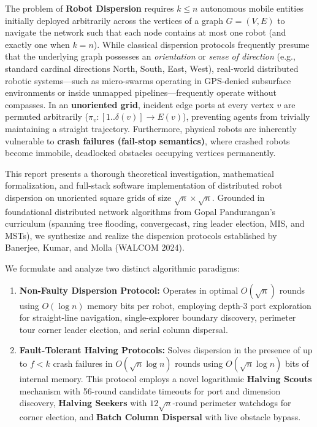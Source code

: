 \documentclass[11pt,a4paper]{report}
\begin{document}
The problem of \textbf{Robot Dispersion} requires $k \le n$ autonomous mobile entities initially deployed arbitrarily across the vertices of a graph $G = (V, E)$ to navigate the network such that each node contains at most one robot (and exactly one when $k = n$). While classical dispersion protocols frequently presume that the underlying graph possesses an \emph{orientation} or \emph{sense of direction} (e.g., standard cardinal directions North, South, East, West), real-world distributed robotic systems---such as micro-swarms operating in GPS-denied subsurface environments or inside unmapped pipelines---frequently operate without compasses. In an \textbf{unoriented grid}, incident edge ports at every vertex $v$ are permuted arbitrarily ($\pi_v: [1..\delta(v)] \to E(v)$), preventing agents from trivially maintaining a straight trajectory. Furthermore, physical robots are inherently vulnerable to \textbf{crash failures (fail-stop semantics)}, where crashed robots become immobile, deadlocked obstacles occupying vertices permanently.

This report presents a thorough theoretical investigation, mathematical formalization, and full-stack software implementation of distributed robot dispersion on unoriented square grids of size $\sqrt{n} \times \sqrt{n}$. Grounded in foundational distributed network algorithms from Gopal Pandurangan's curriculum (spanning tree flooding, convergecast, ring leader election, MIS, and MSTs), we synthesize and realize the dispersion protocols established by Banerjee, Kumar, and Molla (WALCOM 2024).

We formulate and analyze two distinct algorithmic paradigms:
\begin{enumerate}
    \item \textbf{Non-Faulty Dispersion Protocol:} Operates in optimal $O(\sqrt{n})$ rounds using $O(\log n)$ memory bits per robot, employing depth-3 port exploration for straight-line navigation, single-explorer boundary discovery, perimeter tour corner leader election, and serial column dispersal.
    \item \textbf{Fault-Tolerant Halving Protocols:} Solves dispersion in the presence of up to $f < k$ crash failures in $O(\sqrt{n} \log n)$ rounds using $O(\sqrt{n} \log n)$ bits of internal memory. This protocol employs a novel logarithmic \textbf{Halving Scouts} mechanism with 56-round candidate timeouts for port and dimension discovery, \textbf{Halving Seekers} with $12\sqrt{n}$-round perimeter watchdogs for corner election, and \textbf{Batch Column Dispersal} with live obstacle bypass.
\end{enumerate}
\end{document}
